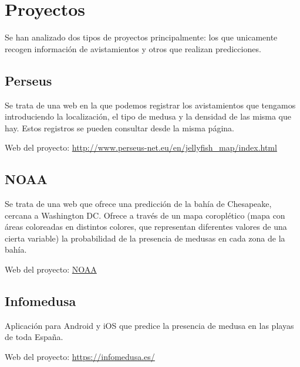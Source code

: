 \section{Proyectos}

Se han analizado dos tipos de proyectos principalmente: los que unicamente recogen información de avistamientos y otros que realizan predicciones.

\subsection{Perseus}

Se trata de una web en la que podemos registrar los avistamientos que tengamos introduciendo la localización, el tipo de medusa y la densidad de las misma que hay.
Estos registros se pueden consultar desde la misma página.

Web del proyecto: \href{http://www.perseus-net.eu/en/jellyfish_map/index.html}{http://www.perseus-net.eu/en/jellyfish\_map/index.html}

\subsection{NOAA}

Se trata de una web que ofrece una predicción de la bahía de Chesapeake, cercana a Washington DC. Ofrece a través de un mapa coroplético (mapa con áreas coloreadas en distintos colores, que representan diferentes valores de una cierta variable) la probabilidad de la presencia de medusas en cada zona de la bahía.

Web del proyecto: \href{https://ocean.weather.gov/Loops/ocean_guidance.php?model=Sea_Nettles&area=Prob&plot=prob&day=0&loop=1}{NOAA}

\subsection{Infomedusa}

Aplicación para Android y iOS que predice la presencia de medusa en las playas de toda España.

Web del proyecto: \href{https://infomedusa.es/}{https://infomedusa.es/}